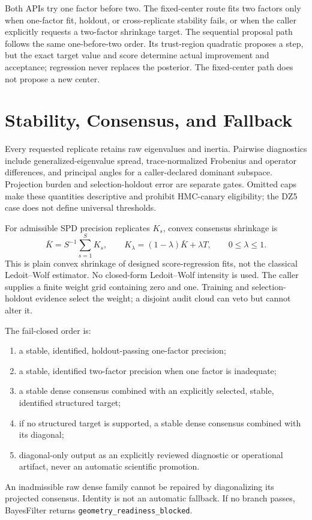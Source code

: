 Both APIs try one factor before two.  The fixed-center route fits two factors
only when one-factor fit, holdout, or cross-replicate stability fails, or when
the caller explicitly requests a two-factor shrinkage target.  The sequential
proposal path follows the same one-before-two order.  Its trust-region
quadratic proposes a step, but the exact target value and score determine actual
improvement and acceptance; regression never replaces the posterior.  The
fixed-center path does not propose a new center.

\section{Stability, Consensus, and Fallback}
\label{sec:bf-curvature-consensus}

Every requested replicate retains raw eigenvalues and inertia.  Pairwise
diagnostics include generalized-eigenvalue spread, trace-normalized Frobenius
and operator differences, and principal angles for a caller-declared dominant
subspace.  Projection burden and selection-holdout error are separate gates.
Omitted caps make these quantities descriptive and prohibit HMC-canary
eligibility; the DZ5 case does not define universal thresholds.

For admissible SPD precision replicates $K_s$, convex consensus shrinkage is
\begin{equation}
  \bar K=S^{-1}\sum_{s=1}^{S}K_s,
  \qquad
  K_\lambda=(1-\lambda)\bar K+\lambda T,
  \qquad 0\leq\lambda\leq1.
  \label{eq:bf-consensus-shrinkage}
\end{equation}
This is plain convex shrinkage of designed score-regression fits, not the
classical Ledoit--Wolf estimator.  No closed-form Ledoit--Wolf intensity is
used.  The caller supplies a finite weight grid containing zero and one.
Training and selection-holdout evidence select the weight; a disjoint audit
cloud can veto but cannot alter it.

The fail-closed order is:
\begin{enumerate}[label=(\roman*)]
  \item a stable, identified, holdout-passing one-factor precision;
  \item a stable, identified two-factor precision when one factor is
    inadequate;
  \item a stable dense consensus combined with an explicitly selected, stable,
    identified structured target;
  \item if no structured target is supported, a stable dense consensus
    combined with its diagonal;
  \item diagonal-only output as an explicitly reviewed diagnostic or
    operational artifact, never an automatic scientific promotion.
\end{enumerate}
An inadmissible raw dense family cannot be repaired by diagonalizing its
projected consensus.  Identity is not an automatic fallback.  If no branch
passes, BayesFilter returns \texttt{geometry\_readiness\_blocked}.
